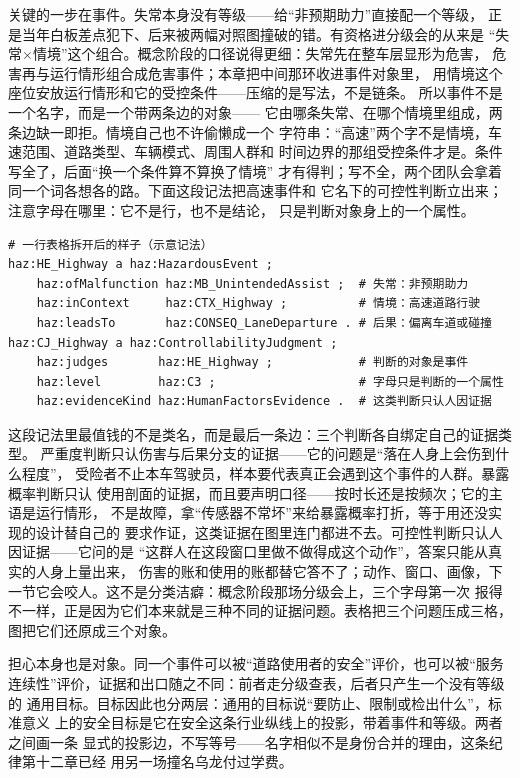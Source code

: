 关键的一步在事件。失常本身没有等级——给“非预期助力”直接配一个等级，
正是当年白板差点犯下、后来被两幅对照图撞破的错。有资格进分级会的从来是
“失常\(\times\)情境”这个组合。概念阶段的口径说得更细：失常先在整车层显形为危害，
危害再与运行情形组合成危害事件；本章把中间那环收进事件对象里，
用情境这个座位安放运行情形和它的受控条件——压缩的是写法，不是链条。
所以事件不是一个名字，而是一个带两条边的对象——
它由哪条失常、在哪个情境里组成，两条边缺一即拒。情境自己也不许偷懒成一个
字符串：“高速”两个字不是情境，车速范围、道路类型、车辆模式、周围人群和
时间边界的那组受控条件才是。条件写全了，后面“换一个条件算不算换了情境”
才有得判；写不全，两个团队会拿着同一个词各想各的路。下面这段记法把高速事件和
它名下的可控性判断立出来；注意字母在哪里：它不是行，也不是结论，
只是判断对象身上的一个属性。

\nopagebreak[4]
\begin{codebox}
\begin{Verbatim}[fontsize=\small,breaklines=true,breakanywhere=true,breaksymbolleft={},breaksymbolright={}]
# 一行表格拆开后的样子（示意记法）
haz:HE_Highway a haz:HazardousEvent ;
    haz:ofMalfunction haz:MB_UnintendedAssist ;  # 失常：非预期助力
    haz:inContext     haz:CTX_Highway ;          # 情境：高速道路行驶
    haz:leadsTo       haz:CONSEQ_LaneDeparture . # 后果：偏离车道或碰撞
haz:CJ_Highway a haz:ControllabilityJudgment ;
    haz:judges       haz:HE_Highway ;            # 判断的对象是事件
    haz:level        haz:C3 ;                    # 字母只是判断的一个属性
    haz:evidenceKind haz:HumanFactorsEvidence .  # 这类判断只认人因证据
\end{Verbatim}
\end{codebox}

这段记法里最值钱的不是类名，而是最后一条边：三个判断各自绑定自己的证据类型。
严重度判断只认伤害与后果分支的证据——它的问题是“落在人身上会伤到什么程度”，
受险者不止本车驾驶员，样本要代表真正会遇到这个事件的人群。暴露概率判断只认
使用剖面的证据，而且要声明口径——按时长还是按频次；它的主语是运行情形，
不是故障，拿“传感器不常坏”来给暴露概率打折，等于用还没实现的设计替自己的
要求作证，这类证据在图里连门都进不去。可控性判断只认人因证据——它问的是
“这群人在这段窗口里做不做得成这个动作”，答案只能从真实的人身上量出来，
伤害的账和使用的账都替它答不了；动作、窗口、画像，下一节它会咬人。这不是分类洁癖：概念阶段那场分级会上，三个字母第一次
报得不一样，正是因为它们本来就是三种不同的证据问题。表格把三个问题压成三格，
图把它们还原成三个对象。

担心本身也是对象。同一个事件可以被“道路使用者的安全”评价，也可以被“服务
连续性”评价，证据和出口随之不同：前者走分级查表，后者只产生一个没有等级的
通用目标。目标因此也分两层：通用的目标说“要防止、限制或检出什么”，标准意义
上的安全目标是它在安全这条行业纵线上的投影，带着事件和等级。两者之间画一条
显式的投影边，不写等号——名字相似不是身份合并的理由，这条纪律第十二章已经
用另一场撞名乌龙付过学费。

